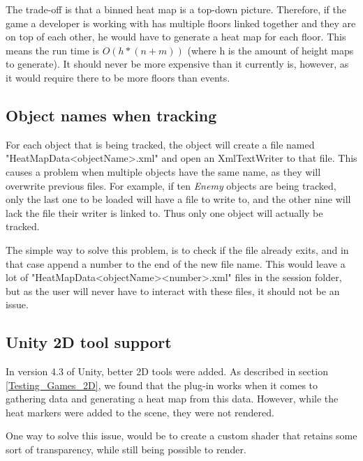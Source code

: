 The trade-off is that a binned heat map is a top-down picture. Therefore, if the game a developer is working with has multiple floors linked together and they are on top of each other, he would have to generate a heat map for each floor. This means the run time is $O(h * (n + m))$ (where h is the amount of height maps to generate). It should never be more expensive than it currently is, however, as it would require there to be more floors than events.


\subsection{Object names when tracking}
\label{Issues_UniqueNames}

For each object that is being tracked, the object will create a file named "HeatMapData<objectName>.xml" and open an XmlTextWriter to that file. This causes a problem when multiple objects have the same name, as they will overwrite previous files. For example, if ten \textit{Enemy} objects are being tracked, only the last one to be loaded will have a file to write to, and the other nine will lack the file their writer is linked to. Thus only one object will actually be tracked.

The simple way to solve this problem, is to check if the file already exits, and in that case append a number to the end of the new file name. This would leave a lot of "HeatMapData<objectName><number>.xml" files in the session folder, but as the user will never have to interact with these files, it should not be an issue.

\subsection{Unity 2D tool support}
\label{Issues_2DSupport}

In version 4.3 of Unity, better 2D tools were added. As described in section \ref{Testing_Games_2D}, we found that the plug-in works when it comes to gathering data and generating a heat map from this data. However, while the heat markers were added to the scene, they were not rendered.

One way to solve this issue, would be to create a custom shader that retains some sort of transparency, while still being possible to render.